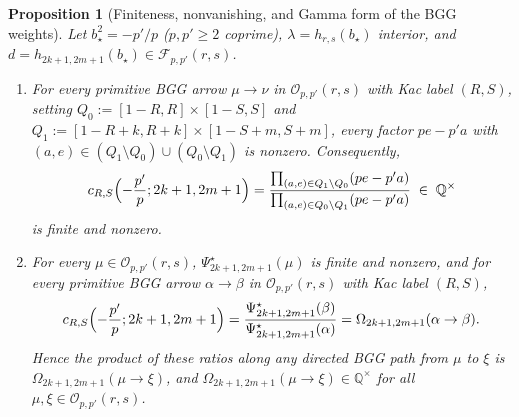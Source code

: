 \documentclass[twoside,10pt]{article}
\numberwithin{equation}{section}
\theoremstyle{slbody}
\newtheorem{proposition}[theorem]{Proposition}
\theoremstyle{definition}
\theoremstyle{remark}
\begin{document}
\begin{proposition}[Finiteness, nonvanishing, and Gamma form of the BGG weights]\label{prop:bgg-cocycle}
Let \(b_\star^2=-p'/p\) (\(p,p'\geq2\) coprime), \(\lambda=h_{r,s}(b_\star)\)
interior, and \(d=h_{2k+1,2m+1}(b_\star)\in\mathcal{F}_{p,p'}(r,s)\).
\begin{enumerate}
 \item[(i)] For every primitive BGG arrow \(\mu\to\nu\) in
   \(\mathcal{O}_{p,p'}(r,s)\) with Kac label \((R,S)\), setting
   \(Q_0:=[1-R,R]\times[1-S,S]\) and \(Q_1:=[1-R+k,R+k]\times[1-S+m,S+m]\),
   every factor \(pe-p'a\) with \((a,e)\in(Q_1\setminus Q_0)\cup(Q_0\setminus Q_1)\)
   is nonzero.  Consequently,
   \begin{equation}\label{eq:reduced-box-mm}
    c_{R,S}\Bigl(-\frac{p'}{p};2k+1,2m+1\Bigr)
    =\frac{\prod_{(a,e)\in Q_1\setminus Q_0}(pe-p'a)}
          {\prod_{(a,e)\in Q_0\setminus Q_1}(pe-p'a)}
    \;\in\;\mathbb{Q}^\times
   \end{equation}
   is finite and nonzero.
 \item[(ii)] For every \(\mu\in\mathcal{O}_{p,p'}(r,s)\),
   \(\Psi^\star_{2k+1,2m+1}(\mu)\) is finite and nonzero, and for every
   primitive BGG arrow \(\alpha\to\beta\) in \(\mathcal{O}_{p,p'}(r,s)\) with
   Kac label \((R,S)\),
   \begin{equation}\label{eq:diamond-cocycle}
    c_{R,S}\Bigl(-\frac{p'}{p};2k+1,2m+1\Bigr)
    =\frac{\Psi^\star_{2k+1,2m+1}(\beta)}{\Psi^\star_{2k+1,2m+1}(\alpha)}
    =\Omega_{2k+1,2m+1}(\alpha\to\beta).
   \end{equation}
   Hence the product of these ratios along any directed BGG path from \(\mu\)
   to \(\xi\) is \(\Omega_{2k+1,2m+1}(\mu\to\xi)\), and
   \(\Omega_{2k+1,2m+1}(\mu\to\xi)\in\mathbb{Q}^\times\) for all
   \(\mu,\xi\in\mathcal{O}_{p,p'}(r,s)\).
\end{enumerate}
\end{proposition}
\end{document}
